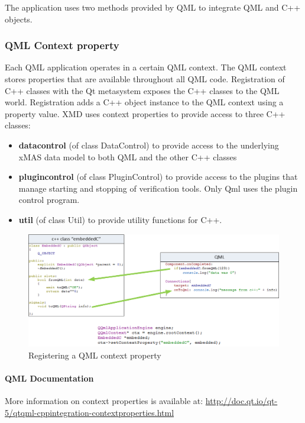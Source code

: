 The application uses two methods provided by QML to integrate QML and C++ objects.

\subsubsection{QML Context property}
Each QML application operates in a certain QML context. The QML context stores
properties that are available throughout all QML code. Registration of C++ classes 
with the Qt metasystem exposes the C++ classes to the QML world.
Registration adds a C++ object instance to the QML context using a property value.
XMD uses context properties to provide access to three C++ classes:

\begin{itemize}
 \item \textbf{datacontrol} (of class DataControl) to provide access to the
 underlying xMAS data model to both QML and the other C++ classes
 \item \textbf{plugincontrol} (of class PluginControl) to provide access to
 the plugins that manage starting and stopping of verification tools. Only Qml
 uses the plugin control program.
 \item \textbf{util} (of class Util) to provide utility functions for C++.
\end{itemize}

\begin{figure}
    \includegraphics[width=\textwidth]{qml3}
    \caption{Registering a QML context property}
\end{figure}

\paragraph{QML Documentation}
More information on context properties is available at:
\url{http://doc.qt.io/qt-5/qtqml-cppintegration-contextproperties.html}


